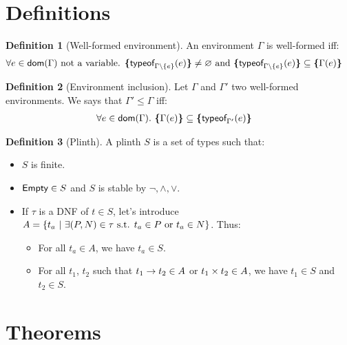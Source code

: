 \documentclass[a4paper]{article}
\theoremstyle{definition}
\newtheorem{definition}{Definition}
\begin{document}
    \section{Definitions}
      
    \begin{definition}[Well-formed environment]
      An environment $\Gamma$ is well-formed iff:
      \begin{align*}
        &\forall e \in \textsf{dom}(\Gamma) \text{ not a variable. } \textbf{\textup{\{}}\textsf{typeof}_{\Gamma\setminus\{e\}}(e)\textbf{\textup{\}}} \neq \varnothing \text{ and } \textbf{\textup{\{}}\textsf{typeof}_{\Gamma\setminus\{e\}}(e)\textbf{\textup{\}}} \subseteq \textbf{\textup{\{}}\Gamma(e)\textbf{\textup{\}}}
      \end{align*}
    \end{definition}
  
    \begin{definition}[Environment inclusion]
      Let $\Gamma$ and $\Gamma'$ two well-formed environments. We says that $\Gamma' \leq \Gamma$ iff:
      \begin{align*}
        &\forall e \in \textsf{dom}(\Gamma).\ \textbf{\textup{\{}}\Gamma(e)\textbf{\textup{\}}} \subseteq \textbf{\textup{\{}}\textsf{typeof}_{\Gamma'}(e)\textbf{\textup{\}}}
      \end{align*}
    \end{definition}
    
    \begin{definition}[Plinth]
      A plinth $S$ is a set of types such that:
      \begin{itemize}
        \item $S$ is finite.
        \item $\textsf{Empty} \in S$ and $S$ is stable by $\neg, \land, \vee$. 
        \item If $\tau$ is a DNF of $t\in S$, let's introduce $A=\{t_a ~|~ \exists (P,N) \in \tau \text{ s.t. } t_a \in P \text{ or } t_a \in N \}$. Thus:
        \begin{itemize}
          \item For all $t_a \in A$, we have $t_a \in S$.
          \item For all $t_1$, $t_2$ such that $t_1\to t_2 \in A$ or $t_1\times t_2 \in A$,
          we have $t_1 \in S$ and $t_2 \in S$.
        \end{itemize}
      \end{itemize}
    \end{definition}

    \section{Theorems}
\end{document}
